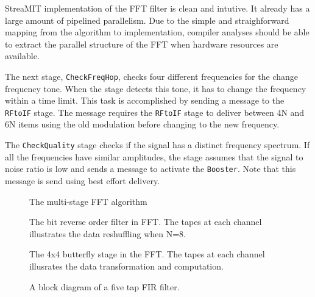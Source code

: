 StreaMIT implementation of the FFT filter is clean and intutive. It
already has a large amount of pipelined parallelism. Due to the simple
and straighforward mapping from the algorithm to implementation,
compiler analyses should be able to extract the parallel structure of
the FFT when hardware resources are available.

The next stage, {\tt CheckFreqHop}, checks four different frequencies
for the change frequency tone. When the stage detects this tone, it
has to change the frequency within a time limit. This task is
accomplished by sending a message to the {\tt RFtoIF} stage.  The
message requires the {\tt RFtoIF} stage to deliver between 4N and 6N
items using the old modulation before changing to the new frequency.

The {\tt CheckQuality} stage checks if the signal has a distinct
frequency spectrum. If all the frequencies have similar amplitudes,
the stage assumes that the signal to noise ratio is low and sends a
message to activate the {\tt Booster}. Note that this message is send
using best effort delivery.



\begin{figure}
\centering
{}
\caption{The multi-stage FFT algorithm}
\label{fig:fftfilter}
\end{figure}

\begin{figure*}
\centering
{}
\caption{The bit reverse order filter in FFT. The tapes at each
channel illustrates the data reshuffling when N=8. }
\label{fig:bitreverseorder}
\end{figure*}

\begin{figure*}
\centering
{}
\caption{The 4x4 butterfly stage in the FFT. The tapes at each channel illusrates the data transformation and computation. }
\label{fig:butterfly}
\end{figure*}

\begin{figure}
\centering
{}
\caption{A block diagram of a five tap FIR filter.}
\label{fig:firfilter}
\end{figure}



\newpage

